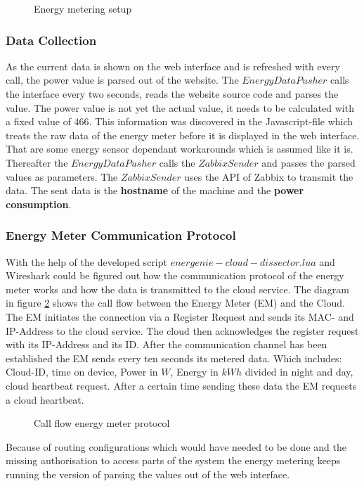 \begin{figure}
	\centering
	\def\svgwidth{\columnwidth}
	
	\caption{Energy metering setup}
	\label{fig:energyMeteringSetup}
\end{figure}

\subsubsection{Data Collection}
As the current data is shown on the web interface and is refreshed with every call, the power value is parsed out of the website. The $ EnergyDataPusher $ calls the interface every two seconds, reads the website source code and parses the value. The power value is not yet the actual value, it needs to be calculated with a fixed value of $ 466 $. This information was discovered in the Javascript-file which treats the raw data of the energy meter before it is displayed in the web interface. That are some energy sensor dependant workarounds which is assumed like it is. Thereafter the $ EnergyDataPusher $ calls the $ ZabbixSender $ and passes the parsed values as parameters. The $ ZabbixSender $ uses the API of Zabbix to transmit the data. The sent data is the \textbf{hostname} of the machine and the \textbf{power consumption}.

\subsubsection{Energy Meter Communication Protocol}
With the help of the developed script $ energenie-cloud-dissector.lua $ and Wireshark could be figured out how the communication protocol of the energy meter works and how the data is transmitted to the cloud service. The diagram in figure \ref{fig:energyCommunicationProtocol} shows the call flow between the Energy Meter (EM) and the Cloud. The EM initiates the connection via a Register Request and sends its MAC- and IP-Address to the cloud service. The cloud then acknowledges the register request with its IP-Address and its ID. After the communication channel has been established the EM sends every ten seconds its metered data. Which includes: Cloud-ID, time on device, Power in $ W $, Energy in $ kWh $ divided in night and day, cloud heartbeat request. After a certain time sending these data the EM requests a cloud heartbeat.

\begin{figure}
	\centering
	\def\svgwidth{0.75\columnwidth}
	
	\caption{Call flow energy meter protocol}
	\label{fig:energyCommunicationProtocol}
\end{figure}

Because of routing configurations which would have needed to be done and the missing authorisation to access parts of the system the energy metering keeps running the version of parsing the values out of the web interface.







